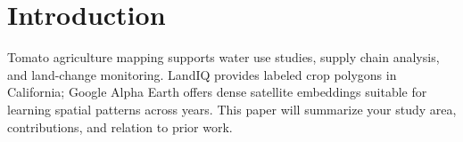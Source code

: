 \section{Introduction}

Tomato agriculture mapping supports water use studies, supply chain analysis, and land-change monitoring. LandIQ provides labeled crop polygons in California; Google Alpha Earth offers dense satellite embeddings suitable for learning spatial patterns across years. This paper will summarize your study area, contributions, and relation to prior work.
